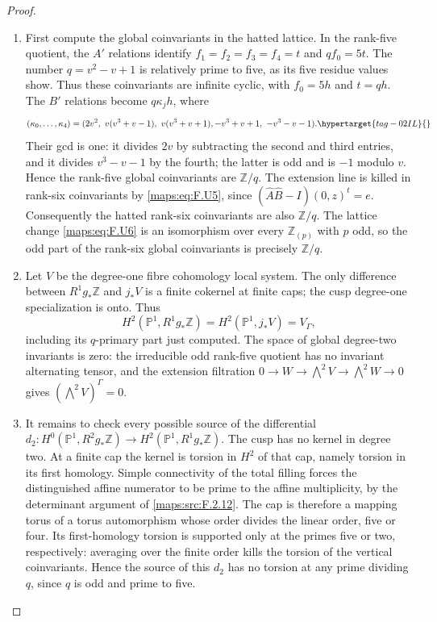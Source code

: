 \documentclass[11pt,a4paper]{article}
\numberwithin{equation}{section}
\theoremstyle{definition}
\begin{document}
\begin{proof}
\begin{enumerate}[label=\arabic*.]
\item First compute the global coinvariants in the hatted lattice.
In the rank-five quotient, the $A'$ relations identify
$f_1=f_2=f_3=f_4=t$ and $qf_0=5t$.
The number $q=v^2-v+1$ is relatively prime to five, as its
five residue values show.  Thus these coinvariants are
infinite cyclic, with $f_0=5h$ and $t=qh$.
The $B'$ relations become $q\kappa_j h$, where
\begin{equation}
 (\kappa_0,\ldots,\kappa_4)=
 (2v^2,\ v(v^3+v-1),\ v(v^3+v+1),
       -v^3+v+1,\ -v^3-v-1).
 \hypertarget{tag-02IL}{}\label{maps:eq:F.U10}
\end{equation}
Their gcd is one: it divides $2v$ by subtracting the second
and third entries, and it divides $v^3-v-1$ by the fourth;
the latter is odd and is $-1$ modulo $v$.
Hence the rank-five global coinvariants are $\mathbb Z/q$.
The extension line is killed in rank-six coinvariants by
\eqref{maps:eq:F.U5}, since
$(\widehat A\widehat B-I)(0,z)^t=e$.
Consequently the hatted rank-six coinvariants are also
$\mathbb Z/q$.  The lattice change \eqref{maps:eq:F.U6} is an isomorphism
over every $\mathbb Z_{(p)}$ with $p$ odd, so the odd part of
the rank-six global coinvariants is precisely
$\mathbb Z/q$.

\item Let $V$ be the degree-one fibre cohomology local system.
The only difference between $R^1g_*\mathbb Z$ and $j_*V$
is a finite cokernel at finite caps; the cusp degree-one
specialization is onto.  Thus
\[
 H^2(\mathbb P^1,R^1g_*\mathbb Z)
 =H^2(\mathbb P^1,j_*V)=V_\Gamma,
\]
including its $q$-primary part just computed.  The space of
global degree-two invariants is zero: the irreducible odd
rank-five quotient has no invariant alternating tensor,
and the extension filtration
$0\to W\to\bigwedge^2V\to\bigwedge^2W\to0$
gives $(\bigwedge^2V)^\Gamma=0$.

\item It remains to check every possible source of the differential
$d_2:H^0(\mathbb P^1,R^2g_*\mathbb Z)
\to H^2(\mathbb P^1,R^1g_*\mathbb Z)$.
The cusp has no kernel in degree two.  At a finite cap the
kernel is torsion in $H^2$ of that cap, namely torsion in its
first homology.  Simple connectivity of the total filling
forces the distinguished affine numerator to be prime to the
affine multiplicity, by the determinant argument of
\ref{maps:src:F.2.12}.  The cap is therefore a mapping torus of a torus
automorphism whose order divides the linear order, five or
four.  Its first-homology torsion is supported only at the
primes five or two, respectively: averaging over the finite
order kills the torsion of the vertical coinvariants.
Hence the source of this $d_2$ has no torsion at any prime
dividing $q$, since $q$ is odd and prime to five.


\end{enumerate}
\end{proof}
\end{document}
